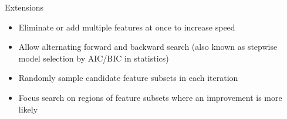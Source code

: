\documentclass[11pt,compress,t,notes=noshow, xcolor=table]{beamer}
\begin{document}
  \begin{vbframe}{Extensions}
    \vspace{-0.1cm}
    \begin{itemize}
      \setlength{\itemsep}{1.2em}
      \item Eliminate or add multiple features at once to increase speed
      \item Allow alternating forward and backward search (also known as stepwise model selection by AIC/BIC in statistics)
      \item Randomly sample candidate feature subsets in each iteration
      \item Focus search on regions of feature subsets where an improvement is more likely
    \end{itemize}
\end{vbframe}
\end{document}
